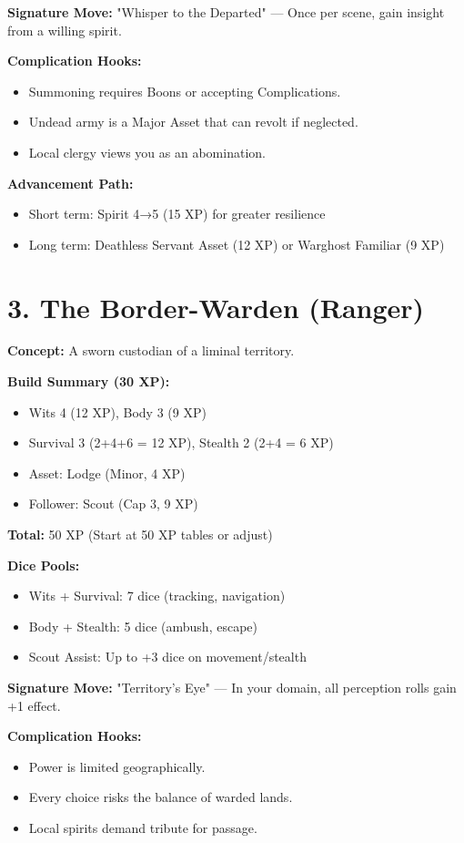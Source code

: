 \textbf{Signature Move:} "Whisper to the Departed" — Once per scene, gain insight from a willing spirit.

\textbf{Complication Hooks:}
\begin{itemize}
  \item Summoning requires Boons or accepting Complications.
  \item Undead army is a Major Asset that can revolt if neglected.
  \item Local clergy views you as an abomination.
\end{itemize}

\textbf{Advancement Path:}
\begin{itemize}
  \item Short term: Spirit 4→5 (15 XP) for greater resilience
  \item Long term: Deathless Servant Asset (12 XP) or Warghost Familiar (9 XP)
\end{itemize}

\section{3. The Border-Warden (Ranger)}

\textbf{Concept:} A sworn custodian of a liminal territory.

\textbf{Build Summary (30 XP):}
\begin{itemize}
  \item Wits 4 (12 XP), Body 3 (9 XP)
  \item Survival 3 (2+4+6 = 12 XP), Stealth 2 (2+4 = 6 XP)
  \item Asset: Lodge (Minor, 4 XP)
  \item Follower: Scout (Cap 3, 9 XP)
\end{itemize}
\textbf{Total:} 50 XP (Start at 50 XP tables or adjust)

\textbf{Dice Pools:}
\begin{itemize}
  \item Wits + Survival: 7 dice (tracking, navigation)
  \item Body + Stealth: 5 dice (ambush, escape)
  \item Scout Assist: Up to +3 dice on movement/stealth
\end{itemize}

\textbf{Signature Move:} "Territory's Eye" — In your domain, all perception rolls gain +1 effect.

\textbf{Complication Hooks:}
\begin{itemize}
  \item Power is limited geographically.
  \item Every choice risks the balance of warded lands.
  \item Local spirits demand tribute for passage.
\end{itemize}

